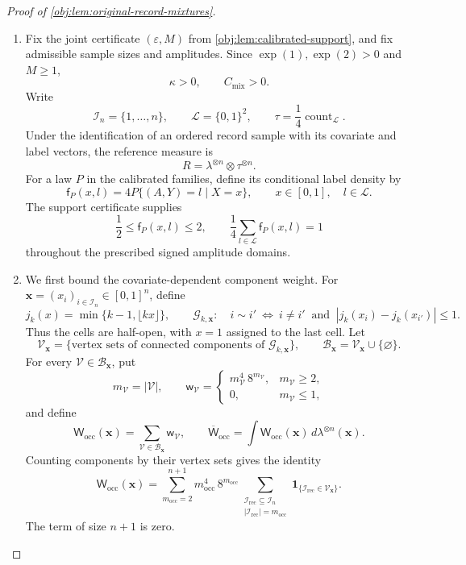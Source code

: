 \begin{proof}[Proof of \cref{obj:lem:original-record-mixtures}]
\begin{enumerate}
\item Fix the joint certificate \((\varepsilon,M)\) from
\cref{obj:lem:calibrated-support}, and fix admissible sample sizes and
amplitudes. Since \(\exp(1),\exp(2)>0\) and \(M\ge1\),
\[
\kappa>0,\qquad C_{\mathrm{mix}}>0.
\]
Write
\[
\mathcal I_n=\{1,\ldots,n\},\qquad
\mathscr L=\{0,1\}^2,\qquad
\tau=\frac14\operatorname{count}_{\mathscr L}.
\]
Under the identification of an ordered record sample with its covariate
and label vectors, the reference measure is
\[
R=\lambda^{\otimes n}\otimes\tau^{\otimes n}.
\]
For a law \(P\) in the calibrated families, define its conditional label
density by
\[
\mathsf f_P(x,l)
=4P\{(A,Y)=l\mid X=x\},
\qquad x\in[0,1],\quad l\in\mathscr L.
\]
The support certificate supplies
\[
\frac12\le \mathsf f_P(x,l)\le2,
\qquad
\frac14\sum_{l\in\mathscr L}\mathsf f_P(x,l)=1
\]
throughout the prescribed signed amplitude domains.

\item We first bound the covariate-dependent component weight. For
\(\mathbf x=(x_i)_{i\in\mathcal I_n}\in[0,1]^n\), define
\[
j_k(x)=\min\{k-1,\lfloor kx\rfloor\},
\qquad
\mathscr G_{k,\mathbf x}:
\quad
i\sim i'
\ \Longleftrightarrow\
i\ne i'\ \text{ and }\ |j_k(x_i)-j_k(x_{i'})|\le1.
\]
Thus the cells are half-open, with \(x=1\) assigned to the last cell.
Let
\[
\mathscr V_{\mathbf x}
=\{\text{vertex sets of connected components of }\mathscr G_{k,\mathbf x}\},
\qquad
\mathscr B_{\mathbf x}=\mathscr V_{\mathbf x}\cup\{\varnothing\}.
\]
For every \(\mathcal V\in\mathscr B_{\mathbf x}\), put
\[
m_{\mathcal V}=|\mathcal V|,
\qquad
\mathsf w_{\mathcal V}
=
\begin{cases}
m_{\mathcal V}^4\,8^{m_{\mathcal V}},&m_{\mathcal V}\ge2,\\
0,&m_{\mathcal V}\le1,
\end{cases}
\]
and define
\[
\mathsf W_{\mathrm{occ}}(\mathbf x)
=\sum_{\mathcal V\in\mathscr B_{\mathbf x}}\mathsf w_{\mathcal V},
\qquad
\overline{\mathsf W}_{\mathrm{occ}}
=\int\mathsf W_{\mathrm{occ}}(\mathbf x)\,
d\lambda^{\otimes n}(\mathbf x).
\]
Counting components by their vertex sets gives the identity
\[
\mathsf W_{\mathrm{occ}}(\mathbf x)
=\sum_{m_{\mathrm{occ}}=2}^{n+1}
m_{\mathrm{occ}}^4\,8^{m_{\mathrm{occ}}}
\sum_{\substack{\mathcal I_{\mathrm{rec}}\subseteq\mathcal I_n\\
|\mathcal I_{\mathrm{rec}}|=m_{\mathrm{occ}}}}
\mathbf1_{\{\mathcal I_{\mathrm{rec}}\in\mathscr V_{\mathbf x}\}}.
\]
The term of size \(n+1\) is zero.


\end{enumerate}
\end{proof}
